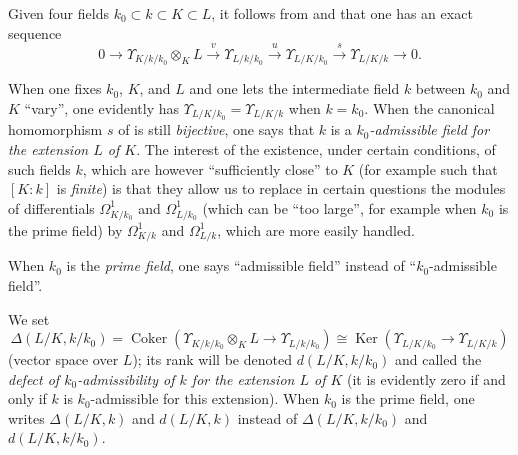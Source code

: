 \begin{env}[21.6.1]
\label{0.21.6.1}
Given four fields $k_0\subset k\subset K\subset L$, it follows from  and  that one has an exact sequence
\begin{equation}
\tag{21.6.1.1}
  \label{0.21.6.1.1}
  0\to\Upsilon_{K/k/k_0}\otimes_K L\xrightarrow{v}\Upsilon_{L/k/k_0}\xrightarrow{u}\Upsilon_{L/K/k_0}\xrightarrow{s}\Upsilon_{L/K/k}\to 0.
\end{equation}

When one fixes $k_0$, $K$, and $L$ and one lets the intermediate field $k$ between $k_0$ and $K$ ``vary'', one evidently has $\Upsilon_{L/K/k_0}=\Upsilon_{L/K/k}$ when $k=k_0$.
When the canonical homomorphism $s$ of  is still \emph{bijective}, one says that $k$ is a \emph{$k_0$-admissible field for the extension $L$ of $K$}.
The interest of the existence, under certain conditions, of such fields $k$, which are however ``sufficiently close'' to $K$ (for example such that $[K:k]$ is \emph{finite}) is that they allow us to replace in certain questions the modules of differentials $\Omega^1_{K/k_0}$ and $\Omega^1_{L/k_0}$ (which can be ``too large'', for example when $k_0$ is the prime field) by $\Omega^1_{K/k}$ and $\Omega^1_{L/k}$, which are more easily handled.

When $k_0$ is the \emph{prime field}, one says ``admissible field'' instead of ``$k_0$-admissible field''.

We set
\begin{equation}
\tag{21.6.1.2}
  \label{0.21.6.1.2}
  \Delta(L/K,k/k_0)=\operatorname{Coker}(\Upsilon_{K/k/k_0}\otimes_K L\to\Upsilon_{L/k/k_0})\cong\operatorname{Ker}(\Upsilon_{L/K/k_0}\to\Upsilon_{L/K/k})
\end{equation}
(vector space over $L$); its rank will be denoted $d(L/K,k/k_0)$ and called the \emph{defect of $k_0$-admissibility of $k$ for the extension $L$ of $K$} (it is evidently zero if and only if $k$ is $k_0$-admissible for this extension).
When $k_0$ is the prime field, one writes $\Delta(L/K,k)$ and $d(L/K,k)$ instead of $\Delta(L/K,k/k_0)$ and $d(L/K,k/k_0)$.
\end{env}

